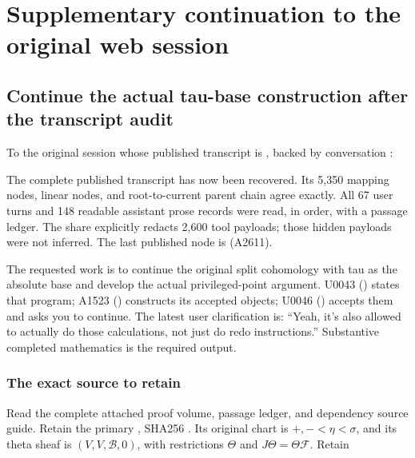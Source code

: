 \clearpage

\section{Supplementary continuation to the original web
session}\label{supplementary-continuation-to-the-original-web-session}

\subsection{Continue the actual tau-base construction after the
transcript
audit}\label{continue-the-actual-tau-base-construction-after-the-transcript-audit}

To the original session whose published transcript is
\href{https://chatgpt.com/share/6aa6bc6e-98cc-83eb-9343-e811c26d6631}{\protect{}},
backed by conversation
\protect{}:

The complete published transcript has now been recovered. Its 5,350
mapping nodes, linear nodes, and root-to-current parent chain agree
exactly. All 67 user turns and 148 readable assistant prose records were
read, in order, with a passage ledger. The share explicitly redacts
2,600 tool payloads; those hidden payloads were not inferred. The last
published node is \protect{}
(A2611).

The requested work is to continue the original split cohomology with tau
as the absolute base and develop the actual privileged-point argument.
U0043 (\protect{}) states that
program; A1523 (\protect{})
constructs its accepted objects; U0046
(\protect{}) accepts them and
asks you to continue. The latest user clarification is: ``Yeah, it's
also allowed to actually do those calculations, not just do redo
instructions.'' Substantive completed mathematics is the required
output.

\subsubsection{The exact source to
retain}\label{the-exact-source-to-retain}

Read the complete attached proof volume, passage ledger, and dependency
source guide. Retain the primary
\protect{}, SHA256
\protect{}.
Its original chart is \(+,-<\eta<\sigma\), and its theta sheaf is
\((V,V,\mathscr B,0)\), with restrictions \(\Theta\) and
\(J\Theta=\Theta\mathcal F\). Retain

